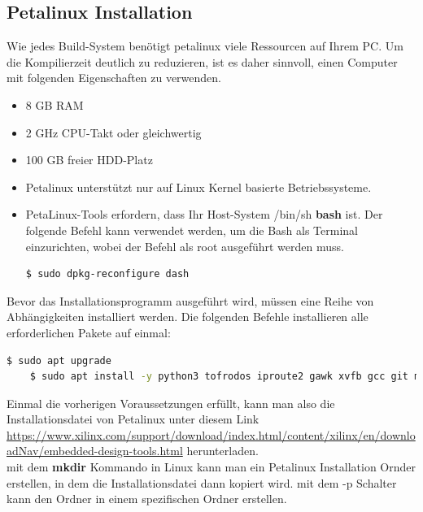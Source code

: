 \subsection{Petalinux Installation}
Wie jedes Build-System benötigt petalinux viele Ressourcen auf Ihrem PC. Um die Kompilierzeit deutlich zu reduzieren, ist es daher sinnvoll, einen Computer mit folgenden Eigenschaften zu verwenden.\cite{Xilinx2020}

\begin{itemize}
	\item 8 GB RAM
	\item 2 GHz CPU-Takt oder gleichwertig
	\item 100 GB freier HDD-Platz
	\item Petalinux unterstützt nur auf Linux Kernel basierte Betriebssysteme. 
	\item PetaLinux-Tools erfordern, dass Ihr Host-System /bin/sh \textbf{bash} ist. Der folgende Befehl kann verwendet werden, um die Bash als Terminal einzurichten, wobei der Befehl als root ausgeführt werden muss. 
	\begin{lstlisting}[language=bash]
		$ sudo dpkg-reconfigure dash
	\end{lstlisting}
\end{itemize}
Bevor das Installationsprogramm ausgeführt wird, müssen eine Reihe von Abhängigkeiten installiert werden. Die folgenden Befehle installieren alle erforderlichen Pakete auf einmal:

\begin{lstlisting}[language=bash]
	$ sudo apt upgrade
	$ sudo apt install -y python3 tofrodos iproute2 gawk xvfb gcc git make net-tools libncurses5-dev tftpd zlib1g-dev ibssl-dev flex bison libselinux1 gnupg wget diffstat chrpath socat xterm autoconf libtool tar unzip texinfo zlib1g-dev gcc-multilib build-essential libsdl1.2-dev libglib2.0-dev screen pax gzip
\end{lstlisting}

 Einmal die vorherigen Voraussetzungen erfüllt, kann man also die Installationsdatei von Petalinux unter diesem Link \url{https://www.xilinx.com/support/download/index.html/content/xilinx/en/downloadNav/embedded-design-tools.html} herunterladen.\\ 
 mit dem \textbf{mkdir} Kommando in Linux kann man ein Petalinux Installation Ornder erstellen, in dem die Installationsdatei dann kopiert wird. mit dem -p Schalter kann den Ordner in einem spezifischen Ordner erstellen.\\
 
